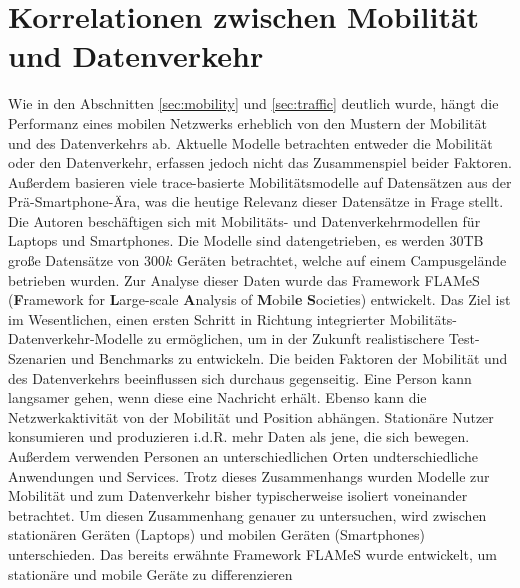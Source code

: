 \documentclass[12pt, a4paper]{article}
\begin{document}
\pagebreak

\section{Korrelationen zwischen Mobilität und Datenverkehr}

Wie in den Abschnitten \ref{sec:mobility} und \ref{sec:traffic} deutlich wurde, hängt die Performanz eines mobilen
Netzwerks erheblich von den Mustern der Mobilität und des Datenverkehrs ab.
\newline\newline
Aktuelle Modelle betrachten entweder die Mobilität oder den Datenverkehr, erfassen jedoch nicht das Zusammenspiel beider Faktoren.
\cite{Alipour2018} Außerdem basieren viele trace-basierte Mobilitätsmodelle auf Datensätzen aus der Prä-Smartphone-Ära,
was die heutige Relevanz dieser Datensätze in Frage stellt. Die Autoren beschäftigen sich mit Mobilitäts- und Datenverkehrmodellen
für Laptops und Smartphones.
\newline\newline
Die Modelle sind datengetrieben, es werden $30$\textsc{TB} große Datensätze von $300 k$ Geräten betrachtet, welche auf einem Campusgelände
betrieben wurden. Zur Analyse dieser Daten wurde das Framework FLAMeS (\textbf{F}ramework for \textbf{L}arge-scale \textbf{A}nalysis of \textbf{M}obil\textbf{e} \textbf{S}ocieties) entwickelt. Das Ziel ist im Wesentlichen, einen ersten Schritt in Richtung integrierter
Mobilitäts-Datenverkehr-Modelle zu ermöglichen, um in der Zukunft realistischere Test-Szenarien und Benchmarks zu entwickeln.
\newline\newline
Die beiden Faktoren der Mobilität und des Datenverkehrs beeinflussen sich durchaus gegenseitig. Eine Person kann langsamer gehen,
wenn diese eine Nachricht erhält. Ebenso kann die Netzwerkaktivität von der Mobilität und Position abhängen. Stationäre Nutzer
konsumieren und produzieren i.d.R. mehr Daten als jene, die sich bewegen. Außerdem verwenden Personen an unterschiedlichen
Orten undterschiedliche Anwendungen und Services. Trotz dieses Zusammenhangs wurden Modelle zur Mobilität und zum Datenverkehr
bisher typischerweise isoliert voneinander betrachtet.
\newline\newline
Um diesen Zusammenhang genauer zu untersuchen, wird zwischen stationären Geräten (Laptops) und mobilen Geräten (Smartphones)
unterschieden. Das bereits erwähnte Framework FLAMeS wurde entwickelt, um stationäre und mobile Geräte zu differenzieren
\end{document}
